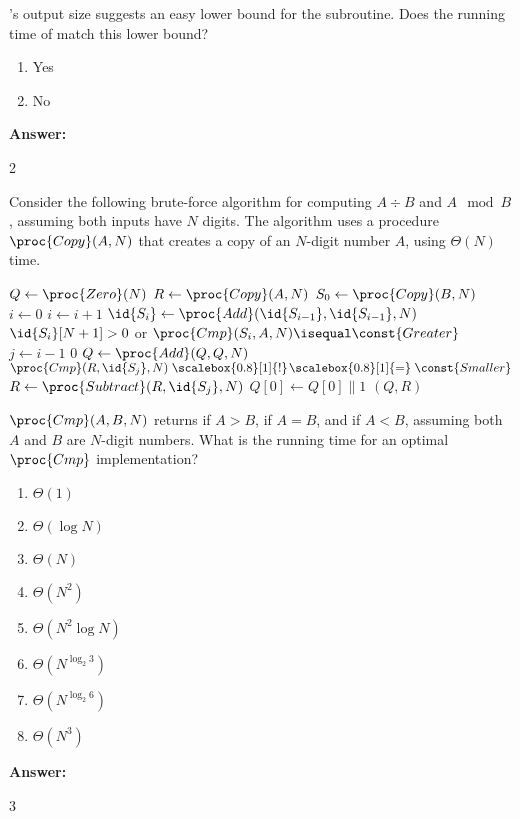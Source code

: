 \documentclass[12pt,twoside]{article}
\newcommand{\isnotequal}{\mathrel{\scalebox{0.8}[1]{!}\hspace*{1pt}\scalebox{0.8}[1]{=}}}
\newcommand{\answer}{
 \par\medskip
 \textbf{Answer:}
}
\newcommand{\answerIf}{ \answer
2
}
\newcommand{\answerIg}{ \answer
3
}
\begin{document}
\begin{problems}
\begin{problemparts}
\problempart {} 's output size suggests an easy lower
bound for the subroutine. Does the running time of  match this
lower bound?
\begin{enumerate}
  \item Yes
  \item No
\end{enumerate}
\answerIf

\end{problemparts}

Consider the following brute-force algorithm for computing $A \div B$ and $A
\mod B$, assuming both inputs have $N$ digits. The algorithm uses a procedure
$\proc{Copy}(A, N)$ that creates a copy of an $N$-digit number $A$, using
$\Theta(N)$ time.

\begin{codebox}
\li $Q \gets \proc{Zero}(N)$ 
\li $R \gets \proc{Copy}(A, N)$ 
\li $S_0 \gets \proc{Copy}(B, N)$ 
\li $i \gets 0$
\li \Repeat \label{li:divmod-repeat}
\li   $i \gets i + 1$
\li   $\id{S_i} \gets \proc{Add}(\id{S_{i - 1}}, \id{S_{i - 1}}, N)$
\li \Until $\id{S_i}[N + 1] > 0$ or $\proc{Cmp}(S_i, A, N) \isequal
            \const{Greater}$
\li \For $j \gets i - 1$ \Downto $0$ \label{li:divmod-for}
\li   \Do
        $Q \gets \proc{Add}(Q, Q, N)$
\li     \If $\proc{Cmp}(R, \id{S_j}, N) \isnotequal \const{Smaller}$
\li     \Then
           $R \gets \proc{Subtract}(R, \id{S_j}, N)$
\li        $Q[0] \gets Q[0] \| 1$ 
        \End
      \End
\li \Return $(Q, R)$
\end{codebox}

\begin{problemparts}
\problempart {} $\proc{Cmp}(A, B, N)$ returns  if $A >
B$,  if $A = B$, and  if $A < B$, assuming both $A$
and $B$ are $N$-digit numbers. What is the running time for an optimal
$\proc{Cmp}$ implementation?
\begin{enumerate}
  \item $\Theta(1)$
  \item $\Theta(\log N)$
  \item $\Theta(N)$
  \item $\Theta(N^2)$
  \item $\Theta(N^2 \log N)$
  \item $\Theta(N^{\log_2 3})$
  \item $\Theta(N^{\log_2 6})$
  \item $\Theta(N^3)$
\end{enumerate}
\answerIg


\end{problemparts}
\end{problems}
\end{document}
